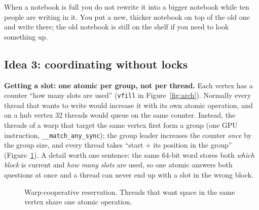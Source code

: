 \documentclass[11pt,a4paper]{article}
\newcommand{\code}[1]{\texttt{#1}}
\begin{document}
\begin{analogy}
When a notebook is full you do not rewrite it into a bigger notebook while ten people are writing in it. You put a
new, thicker notebook on top of the old one and write there; the old notebook is still on the shelf if you need to
look something up.
\end{analogy}

\subsection{Idea 3: coordinating without locks}
\textbf{Getting a slot: one atomic per group, not per thread.}
Each vertex has a counter ``how many slots are used'' (\code{vfill} in Figure~\ref{fig:arch}). Normally every thread
that wants to write would increase it with its own atomic operation, and on a hub vertex 32 threads would queue on the
same counter. Instead, the threads of a warp that target the same vertex first form a group (one GPU instruction,
\code{\_\_match\_any\_sync}); the group leader increases the counter \emph{once} by the group size, and every thread takes
``start + its position in the group'' (Figure~\ref{fig:resv}). A detail worth one sentence: the same 64-bit word stores
both \emph{which block} is current and \emph{how many slots} are used, so one atomic answers both questions at once and a
thread can never end up with a slot in the wrong block.

\begin{figure}[H]
\centering
{}
\caption{Warp-cooperative reservation. Threads that want space in the same vertex share one atomic operation.}
\label{fig:resv}
\end{figure}
\end{document}
